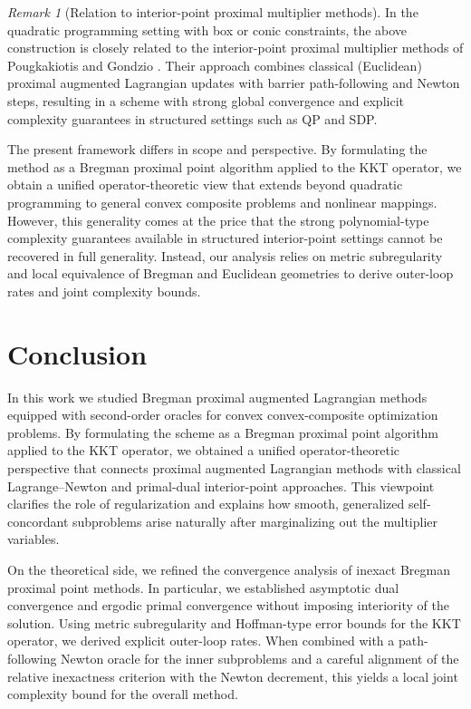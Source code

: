 \documentclass[11pt,onecolumn]{article}
\theoremstyle{remark}
\newtheorem{remark}[remark]{Remark}
\begin{document}
\begin{remark}[Relation to interior-point proximal multiplier methods]
In the quadratic programming setting with box or conic constraints,
the above construction is closely related to the interior-point
proximal multiplier methods of Pougkakiotis and Gondzio
\cite{pougkakiotis2021interior,pougkakiotis2022interior}.
Their approach combines classical (Euclidean) proximal augmented Lagrangian updates
with barrier path-following and Newton steps, resulting in a scheme with strong global convergence and explicit
complexity guarantees in structured settings such as QP and SDP.

The present framework differs in scope and perspective.
By formulating the method as a Bregman proximal point algorithm
applied to the KKT operator, we obtain a unified operator-theoretic
view that extends beyond quadratic programming to general
convex composite problems and nonlinear mappings.
However, this generality comes at the price that the strong
polynomial-type complexity guarantees available in structured
interior-point settings cannot be recovered in full generality.
Instead, our analysis relies on metric subregularity and
local equivalence of Bregman and Euclidean geometries to derive
outer-loop rates and joint complexity bounds.
\end{remark}

\section{Conclusion} \label{sec:conclusion}
In this work we studied Bregman proximal augmented Lagrangian methods equipped with second-order oracles for convex convex-composite optimization problems. By formulating the scheme as a Bregman proximal point algorithm applied to the KKT operator, we obtained a unified operator-theoretic perspective that connects proximal augmented Lagrangian methods with classical Lagrange--Newton and primal-dual interior-point approaches. This viewpoint clarifies the role of regularization and explains how smooth, generalized self-concordant subproblems arise naturally after marginalizing out the multiplier variables.

On the theoretical side, we refined the convergence analysis of inexact Bregman proximal point methods. In particular, we established asymptotic dual convergence and ergodic primal convergence without imposing interiority of the solution. Using metric subregularity and Hoffman-type error bounds for the KKT operator, we derived explicit outer-loop rates. When combined with a path-following Newton oracle for the inner subproblems and a careful alignment of the relative inexactness criterion with the Newton decrement, this yields a local joint complexity bound for the overall method.
\end{document}

